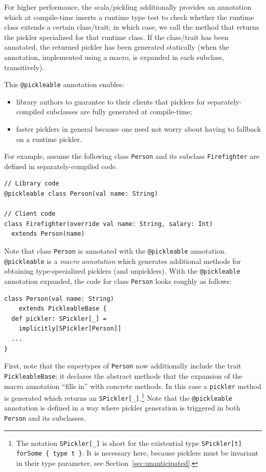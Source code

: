 \documentclass[preprint,10pt]{sigplanconf}
\theoremstyle{definition}
\theoremstyle{definition}
\begin{document}
For higher performance, the scala/pickling additionally provides an
annotation which at compile-time inserts a runtime type test to check whether
the runtime class extends a certain class/trait; in which case, we call the
method that returns the pickler specialized for that runtime class. If the
class/trait has been annotated, the returned pickler has been generated
statically (when the annotation, implemented using a macro, is expanded in
each subclass, transitively).

This \verb|@pickleable| annotation enables:

\begin{itemize}
\item library authors to guarantee to their clients that picklers for separately-compiled
subclasses are fully generated at compile-time;

\item faster picklers in general because one need not worry about having to
fallback on a runtime pickler.
\end{itemize}

For example, assume the following class \verb|Person| and its subclass
\verb|Firefighter| are defined in separately-compiled code.

\begin{lstlisting}
// Library code
@pickleable class Person(val name: String)

// Client code
class Firefighter(override val name: String, salary: Int)
  extends Person(name)
\end{lstlisting}

Note that class \verb|Person| is annotated with the \verb|@pickleable|
annotation. \verb|@pickleable| is a {\em macro annotation} which generates
additional methods for obtaining type-specialized picklers (and unpicklers).
With the \verb|@pickleable| annotation expanded, the code for class
\verb|Person| looks roughly as follows:

\begin{lstlisting}
class Person(val name: String)
    extends PickleableBase {
  def pickler: SPickler[_] =
    implicitly[SPickler[Person]]
  ...
}
\end{lstlisting}

First, note that the supertypes of \verb|Person| now additionally include the
trait \verb|PickleableBase|; it declares the abstract methods that the
expansion of the macro annotation ``fills in'' with concrete methods. In this
case a \verb|pickler| method is generated which returns an
\verb|SPickler[_]|.\footnote{The notation \texttt{SPickler[\_]} is short for
the existential type \texttt{SPickler[t] forSome \{ type t \}}. It is necessary
here, because picklers must be invariant in their type parameter, see
Section~\ref{sec:unanticipated}.} Note that the \verb|@pickleable| annotation
is defined in a way where pickler generation is triggered in both
\verb|Person| and its subclasses.
\end{document}
